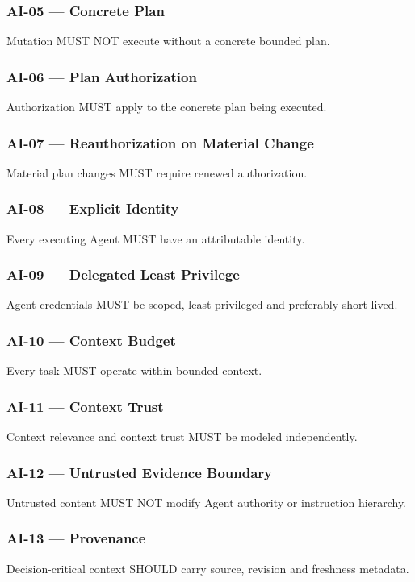 \documentclass[11pt,a4paper]{article}
\begin{document}
\subsubsection{AI-05 — Concrete Plan}
Mutation MUST NOT execute without a concrete bounded plan.

\subsubsection{AI-06 — Plan Authorization}
Authorization MUST apply to the concrete plan being executed.

\subsubsection{AI-07 — Reauthorization on Material Change}
Material plan changes MUST require renewed authorization.

\subsubsection{AI-08 — Explicit Identity}
Every executing Agent MUST have an attributable identity.

\subsubsection{AI-09 — Delegated Least Privilege}
Agent credentials MUST be scoped, least-privileged and preferably short-lived.

\subsubsection{AI-10 — Context Budget}
Every task MUST operate within bounded context.

\subsubsection{AI-11 — Context Trust}
Context relevance and context trust MUST be modeled independently.

\subsubsection{AI-12 — Untrusted Evidence Boundary}
Untrusted content MUST NOT modify Agent authority or instruction hierarchy.

\subsubsection{AI-13 — Provenance}
Decision-critical context SHOULD carry source, revision and freshness metadata.
\end{document}
